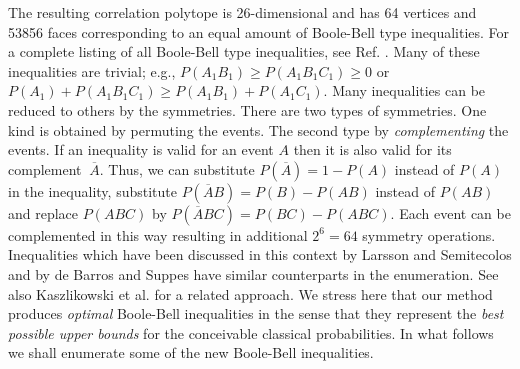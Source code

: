 The resulting correlation polytope is 26-dimensional and has 64 vertices and 53856 faces
corresponding to an equal amount of Boole-Bell type inequalities.
For a complete listing of all Boole-Bell type inequalities, see Ref. \cite{pit-svo-list1}.
Many of these inequalities are trivial; e.g.,   $P(A_1B_1) \ge  P(A_1B_1C_1)  \ge  0$ or
$ P(A_1) + P(A_1B_1C_1)\ge   P(A_1B_1) + P(A_1C_1) $.
Many inequalities can be reduced to others by the symmetries. There are two
types of symmetries.
One kind is obtained by permuting the events. The second type by \textit{
complementing} the events. If an
inequality is valid for an event $A$ then it is also valid for its
complement $\ \overline{A}$. Thus, we can substitute
$P(\overline{A})=1-P(A)$ instead of $P(A)$ in the inequality, substitute $P(
\overline{A}B)=P(B)-P(AB)$ instead of
$P(AB)$ and replace $P(ABC)$ by $P(\overline{A}BC)=P(BC)-P(ABC)$. Each event
can be complemented
in this way resulting in additional $2^{6}=64$ symmetry operations.
Inequalities which have been discussed in this context
by Larsson and Semitecolos \cite{lars-semi} and by
de Barros and Suppes \cite{deBarros-Suppes} have similar counterparts in the enumeration.
See also Kaszlikowski et al. \cite{kasz-2000} for a related approach.
We stress here that our method produces {\em optimal} Boole-Bell inequalities in the sense that they
represent
the {\em best possible upper bounds} for the conceivable classical probabilities.
In what follows we shall enumerate some of the new Boole-Bell inequalities.
